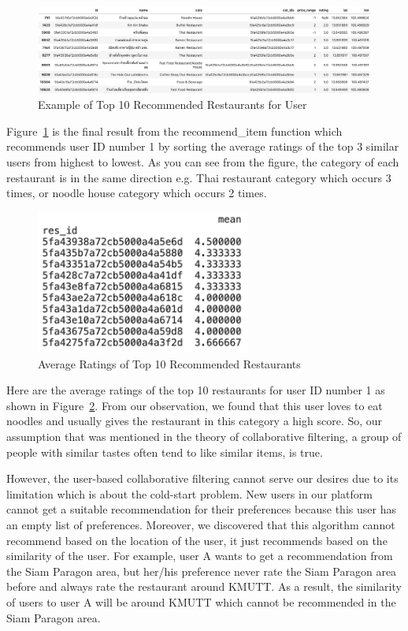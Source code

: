\documentclass[12pt,oneside,openright,a4paper]{cpe-english-project}
\begin{document}
\begin{figure}[H]\centering
\includegraphics[width=350pt]{./images/4ExampleofTop10RecommendedRestaurantsforUser.png}
\caption{Example of Top 10 Recommended Restaurants for User}\label{fig:4ExampleofTop10RecommendedRestaurantsforUser}
\end{figure}

Figure~\ref{fig:4ExampleofTop10RecommendedRestaurantsforUser} is the final result from the recommend\_item function which recommends user ID number 1 by sorting the average ratings of the top 3 similar users from highest to lowest. As you can see from the figure, the category of each restaurant is in the same direction e.g. Thai restaurant category which occurs 3 times, or noodle house category which occurs 2 times.

\begin{figure}[H]\centering
\includegraphics[width=200pt]{./images/4AverageRatingsofTop10RecommendedRestaurants.png}
\caption{Average Ratings of Top 10 Recommended Restaurants}\label{fig:4AverageRatingsofTop10RecommendedRestaurants}
\end{figure}

Here are the average ratings of the top 10 restaurants for user ID number 1 as shown in Figure~\ref{fig:4AverageRatingsofTop10RecommendedRestaurants}. From our observation, we found that this user loves to eat noodles and usually gives the restaurant in this category a high score. So, our assumption that was mentioned in the theory of collaborative filtering, a group of people with similar tastes often tend to like similar items, is true.

However, the user-based collaborative filtering cannot serve our desires due to its limitation which is about the cold-start problem. New users in our platform cannot get a suitable recommendation for their preferences because this user has an empty list of preferences. Moreover, we discovered that this algorithm cannot recommend based on the location of the user, it just recommends based on the similarity of the user. For example, user A wants to get a recommendation from the Siam Paragon area, but her/his preference never rate the Siam Paragon area before and always rate the restaurant around KMUTT. As a result, the similarity of users to user A will be around KMUTT which cannot be recommended in the Siam Paragon area.
\end{document}
